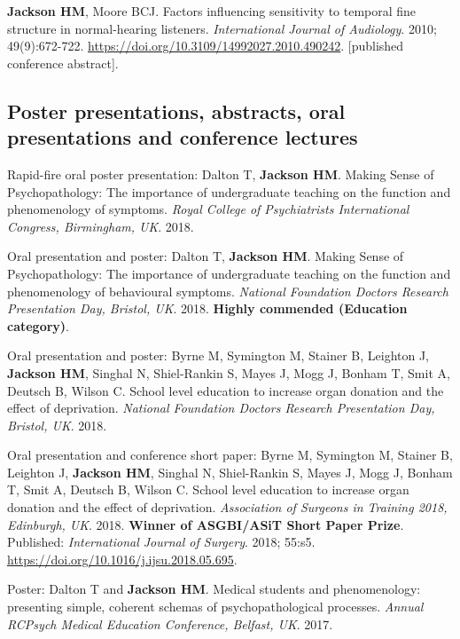 \documentclass[a4paper, oneside, final, 11pt]{scrartcl} %
\begin{document}
\bigskip

\textbf{Jackson HM}, Moore BCJ. Factors influencing sensitivity to temporal fine structure in normal-hearing listeners. \textit{International Journal of Audiology}. 2010; 49(9):672-722. \url{https://doi.org/10.3109/14992027.2010.490242}. [published conference abstract].

\bigskip



\subsection*{Poster presentations, abstracts, oral presentations and conference lectures}

Rapid-fire oral poster presentation: Dalton T, \textbf{Jackson HM}. Making Sense of Psychopathology: The importance of undergraduate teaching on the function and phenomenology of symptoms. \textit{Royal College of Psychiatrists International Congress, Birmingham, UK}. 2018.

\bigskip

Oral presentation and poster: Dalton T, \textbf{Jackson HM}. Making Sense of Psychopathology: The importance of undergraduate teaching on the function and phenomenology of behavioural symptoms. \textit{National Foundation Doctors Research Presentation Day, Bristol, UK}. 2018. \textbf{Highly commended (Education category)}.

\bigskip

Oral presentation and poster: Byrne M, Symington M, Stainer B, Leighton J, \textbf{Jackson HM}, Singhal N, Shiel-Rankin S, Mayes J, Mogg J, Bonham T, Smit A, Deutsch B, Wilson C. School level education to increase organ donation and the effect of deprivation. \textit{National Foundation Doctors Research Presentation Day, Bristol, UK}. 2018.

\bigskip

Oral presentation and conference short paper: Byrne M, Symington M, Stainer B, Leighton J, \textbf{Jackson HM}, Singhal N, Shiel-Rankin S, Mayes J, Mogg J, Bonham T, Smit A, Deutsch B, Wilson C. School level education to increase organ donation and the effect of deprivation. \textit{Association of Surgeons in Training 2018, Edinburgh, UK}. 2018. \textbf{Winner of ASGBI/ASiT Short Paper Prize}. Published: \textit{International Journal of Surgery}. 2018; 55:s5. \url{https://doi.org/10.1016/j.ijsu.2018.05.695}.

\bigskip

Poster: Dalton T and \textbf{Jackson HM}. Medical students and phenomenology: presenting simple, coherent schemas of psychopathological processes. \textit{Annual RCPsych Medical Education Conference, Belfast, UK}. 2017.
\end{document}
